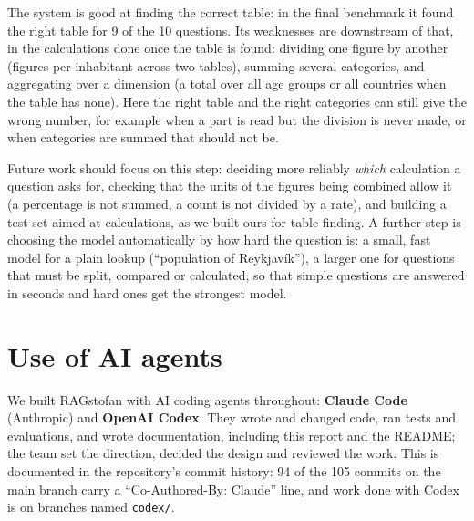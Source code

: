 \documentclass[10pt,a4paper]{article}
\begin{document}
The system is good at finding the correct table: in the final benchmark it found the right table for 9 of the 10
questions. Its weaknesses are downstream of that, in the calculations done once the table is found: dividing one
figure by another (figures per inhabitant across two tables), summing several categories, and aggregating over a
dimension (a total over all age groups or all countries when the table has none). Here the right table and the right
categories can still give the wrong number, for example when a part is read but the division is never made, or when
categories are summed that should not be.

Future work should focus on this step: deciding more reliably \emph{which} calculation a question asks for, checking
that the units of the figures being combined allow it (a percentage is not summed, a count is not divided by a rate),
and building a test set aimed at calculations, as we built ours for table finding. A further step is choosing the
model automatically by how hard the question is: a small, fast model for a plain lookup (``population of
Reykjavík''), a larger one for questions that must be split, compared or calculated, so that simple questions are
answered in seconds and hard ones get the strongest model.

\section*{Use of AI agents}

We built RAGstofan with AI coding agents throughout: \textbf{Claude Code} (Anthropic) and \textbf{OpenAI Codex}. They
wrote and changed code, ran tests and evaluations, and wrote documentation, including this report and the README;
the team set the direction, decided the design and reviewed the work. This is documented in the repository's commit
history: 94 of the 105 commits on the main branch carry a ``Co-Authored-By: Claude'' line, and work done with Codex is
on branches named \texttt{codex/}.
\end{document}
